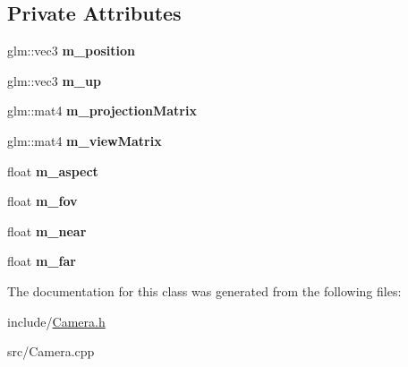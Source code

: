 \subsection*{Private Attributes}
\begin{DoxyCompactItemize}
\item 
\hypertarget{class_camera_aa4d06d49524248f81823444fa2544da0}{glm\-::vec3 {\bfseries m\-\_\-position}}\label{class_camera_aa4d06d49524248f81823444fa2544da0}

\item 
\hypertarget{class_camera_af2a8632b36b3c7b1a79234ab4ccf4059}{glm\-::vec3 {\bfseries m\-\_\-up}}\label{class_camera_af2a8632b36b3c7b1a79234ab4ccf4059}

\item 
\hypertarget{class_camera_a26d7567bf34d14260f887a0382aeae29}{glm\-::mat4 {\bfseries m\-\_\-projection\-Matrix}}\label{class_camera_a26d7567bf34d14260f887a0382aeae29}

\item 
\hypertarget{class_camera_a11c9caa79662eca069eda13481913a25}{glm\-::mat4 {\bfseries m\-\_\-view\-Matrix}}\label{class_camera_a11c9caa79662eca069eda13481913a25}

\item 
\hypertarget{class_camera_abf58e1558e08e785c929f41b25615c30}{float {\bfseries m\-\_\-aspect}}\label{class_camera_abf58e1558e08e785c929f41b25615c30}

\item 
\hypertarget{class_camera_aa404a4e057fa16fb82ce8668d7a661b6}{float {\bfseries m\-\_\-fov}}\label{class_camera_aa404a4e057fa16fb82ce8668d7a661b6}

\item 
\hypertarget{class_camera_a88a4135705f989e598056d765b7a3494}{float {\bfseries m\-\_\-near}}\label{class_camera_a88a4135705f989e598056d765b7a3494}

\item 
\hypertarget{class_camera_a244474dcfdd0115417b8218cbad547d1}{float {\bfseries m\-\_\-far}}\label{class_camera_a244474dcfdd0115417b8218cbad547d1}

\end{DoxyCompactItemize}


The documentation for this class was generated from the following files\-:\begin{DoxyCompactItemize}
\item 
include/\hyperlink{_camera_8h}{Camera.\-h}\item 
src/Camera.\-cpp\end{DoxyCompactItemize}
